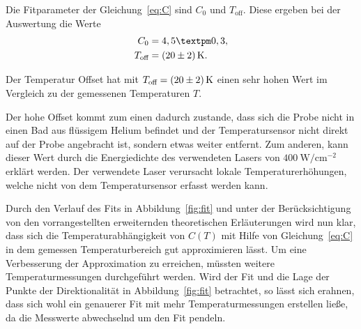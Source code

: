 Die Fitparameter der Gleichung~\ref{eq:C} sind $C_0$ und $T_\text{off}$.
Diese ergeben bei der Auswertung die Werte 
\begin{align}
    C_0 & = 4,5 ± 0,3, \\
    T_\text{off} & = \SI{ 20 \pm 2}{\kelvin}.
\end{align}

Der Temperatur Offset hat mit $T_\text{off} = \SI{ 20 \pm 2}{\kelvin}$ einen sehr hohen Wert
im Vergleich zu der gemessenen Temperaturen $T$.

Der hohe Offset kommt zum einen dadurch zustande, dass sich die Probe nicht in
einen Bad aus flüssigem Helium befindet und der Temperatursensor nicht direkt
auf der Probe angebracht ist, sondern etwas weiter entfernt. 
Zum anderen, kann dieser Wert durch die Energiedichte des verwendeten Lasers von $\SI{400}{\watt\per\centi\meter^{-2}}$
erklärt werden.
Der verwendete Laser verursacht lokale Temperaturerhöhungen, welche nicht 
von dem Temperatursensor erfasst werden kann.

Durch den Verlauf des Fits in Abbildung~\ref{fig:fit} und unter der Berücksichtigung von den
vorrangestellten erweiternden theoretischen Erläuterungen wird nun klar, dass
sich die Temperaturabhängigkeit von $C(T)$ mit Hilfe von Gleichung~\ref{eq:C} in dem
gemessen Temperaturbereich gut approximieren lässt.
Um eine Verbesserung der Approximation zu erreichen, müssten weitere Temperaturmessungen 
durchgeführt werden. 
Wird der Fit und die Lage der Punkte der Direktionalität in Abbildung~\ref{fig:fit} betrachtet, so
lässt sich erahnen, dass sich wohl ein genauerer Fit mit mehr Temperaturmessungen erstellen ließe,
da die Messwerte abwechselnd um den Fit pendeln.